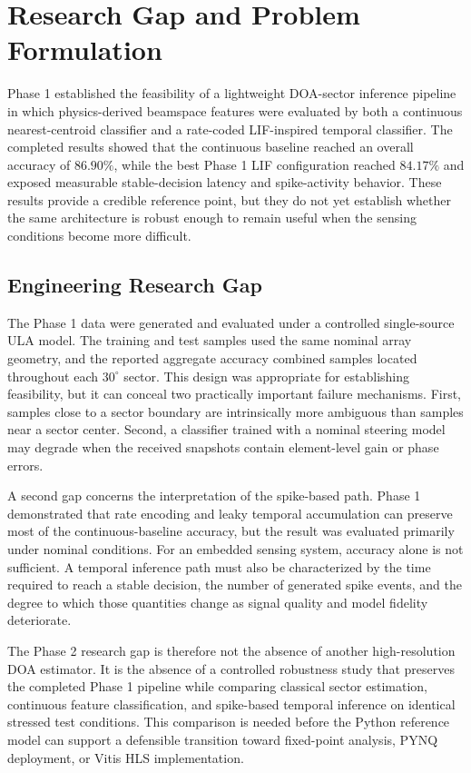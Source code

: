 \section{Research Gap and Problem Formulation}

Phase 1 established the feasibility of a lightweight DOA-sector inference pipeline in which physics-derived beamspace features were evaluated by both a continuous nearest-centroid classifier and a rate-coded LIF-inspired temporal classifier. The completed results showed that the continuous baseline reached an overall accuracy of $86.90\%$, while the best Phase 1 LIF configuration reached $84.17\%$ and exposed measurable stable-decision latency and spike-activity behavior. These results provide a credible reference point, but they do not yet establish whether the same architecture is robust enough to remain useful when the sensing conditions become more difficult.

\subsection{Engineering Research Gap}

The Phase 1 data were generated and evaluated under a controlled single-source ULA model. The training and test samples used the same nominal array geometry, and the reported aggregate accuracy combined samples located throughout each $30^{\circ}$ sector. This design was appropriate for establishing feasibility, but it can conceal two practically important failure mechanisms. First, samples close to a sector boundary are intrinsically more ambiguous than samples near a sector center. Second, a classifier trained with a nominal steering model may degrade when the received snapshots contain element-level gain or phase errors.

A second gap concerns the interpretation of the spike-based path. Phase 1 demonstrated that rate encoding and leaky temporal accumulation can preserve most of the continuous-baseline accuracy, but the result was evaluated primarily under nominal conditions. For an embedded sensing system, accuracy alone is not sufficient. A temporal inference path must also be characterized by the time required to reach a stable decision, the number of generated spike events, and the degree to which those quantities change as signal quality and model fidelity deteriorate.

The Phase 2 research gap is therefore not the absence of another high-resolution DOA estimator. It is the absence of a controlled robustness study that preserves the completed Phase 1 pipeline while comparing classical sector estimation, continuous feature classification, and spike-based temporal inference on identical stressed test conditions. This comparison is needed before the Python reference model can support a defensible transition toward fixed-point analysis, PYNQ deployment, or Vitis HLS implementation.

